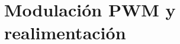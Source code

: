 \documentclass[e4_tp1_main.tex]{subfiles}
\begin{document}
\section{Modulaci\'on PWM y realimentaci\'on}
\end{document}
